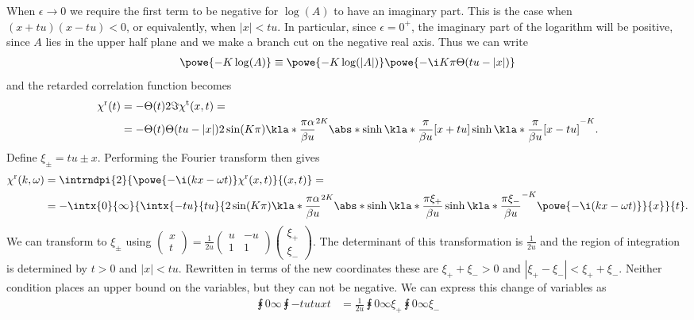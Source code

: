 \documentclass[english, parskip=full]{scrartcl}
\renewcommand{\r}{\text{r}}
\renewcommand{\t}{\text{t}}
\begin{document}
When $\epsilon \rightarrow 0$ we require the first term to be negative for $\log (A)$ to have an imaginary part.
This is the case when $(x+tu)(x-tu) < 0$, or equivalently, when $|x| < tu$.
In particular, since $\epsilon = 0^+$, the imaginary part of the logarithm will be positive, since $A$ lies in the upper half plane and we make a branch cut on the negative real axis.
Thus we can write
\begin{align}
\powe{-K\log (A)} \equiv \powe{- K\log (|A|) } \powe{-\i K\pi \Theta(tu - |x|)}
\end{align}
and the retarded correlation function becomes
\begin{align}
\chi^\r(t) &= -\Theta(t) 2\Im\chi^\t (x,t) = \\
&= -\Theta(t) \Theta (tu - |x|) 2\sin(K\pi) \kla*{\frac{\pi\alpha}{\beta u}}^{2K} \abs*{\sinh\kla*{\frac{\pi}{\beta u} [x+tu]} \sinh\kla*{\frac{\pi}{\beta u}[x-tu]}}^{-K}.
\end{align}
Define $\xi_\pm = tu \pm x$.
Performing the Fourier transform then gives
\begin{align}
\chi^\r(k,\omega) &= \intrndpi{2}{\powe{-\i (kx - \omega t)} \chi^\r(x,t)}{(x,t)} = \\
&= -\intx{0}{\infty}{\intx{-tu}{tu}{ 2\sin(K\pi) \kla*{\frac{\pi\alpha}{\beta u}}^{2K} \abs*{\sinh\kla*{\frac{\pi\xi_+}{\beta u}} \sinh\kla*{\frac{\pi\xi_-}{\beta u}}}^{-K} \powe{-\i (kx - \omega t)} }{x}}{t}.
\end{align}
We can transform to $\xi_\pm$ using $ \begin{pmatrix}
x \\ t
\end{pmatrix} = \frac{1}{2u}\begin{pmatrix}
u & -u \\ 1 & 1
\end{pmatrix} \begin{pmatrix}
\xi_+ \\ \xi_-
\end{pmatrix}$.
The determinant of this transformation is $\frac{1}{2u}$ and the region of integration is determined by $t> 0$ and $|x|< tu$.
Rewritten in terms of the new coordinates these are $\xi_++\xi_- > 0$ and $|\xi_+ - \xi_-| < \xi_+ + \xi_- $.
Neither condition places an upper bound on the variables, but they can not be negative.
We can express this change of variables as
\begin{align}
\intx{0}{\infty}{\intx{-tu}{tu}{ }{x}}{t} &= \frac{1}{2u} \intx{0}{\infty}{ }{\xi_+} \intx{0}{\infty}{ }{\xi_-}
\end{align}
\end{document}
